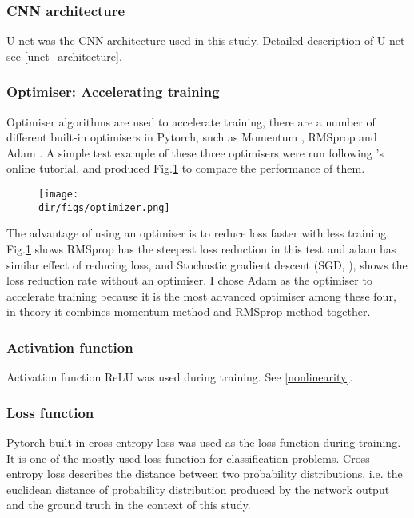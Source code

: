 \subsubsection{CNN architecture}
U-net was the CNN architecture used in this study. Detailed description of U-net see \ref{unet_architecture}.

\subsubsection{Optimiser: Accelerating training}
Optimiser algorithms are used to accelerate training, there are a number of different built-in optimisers in Pytorch, such as Momentum \citep{sutskever2013importance}, RMSprop \citep{graves2013generating} and Adam \citep{kingma2014adam}. A simple test example of these three optimisers were run following \citet{MofanPython}'s online tutorial, and produced Fig.\ref{optimizer} to compare the performance of them.

\begin{figure}[htbp]
  \centering
  \texttt{[image: \\dir/figs/optimizer.png]}
  \caption{}
  \label{optimizer}
\end{figure}

The advantage of using an optimiser is to reduce loss faster with less training. Fig.\ref{optimizer} shows RMSprop has the steepest loss reduction in this test and adam has similar effect of reducing loss, and Stochastic gradient descent (SGD, \citet{bottou2010large}), shows the loss reduction rate without an optimiser. I chose Adam as the optimiser to accelerate training because it is the most advanced optimiser among these four, in theory it combines momentum method and RMSprop method together.

\subsubsection{Activation function}
Activation function ReLU was used during training. See \ref{nonlinearity}.

\subsubsection{Loss function}
Pytorch built-in cross entropy loss was used as the loss function during training. It is one of the mostly used loss function for classification problems. Cross entropy loss describes the distance between two probability distributions, i.e. the euclidean distance of probability distribution produced by the network output and the ground truth in the context of this study.

